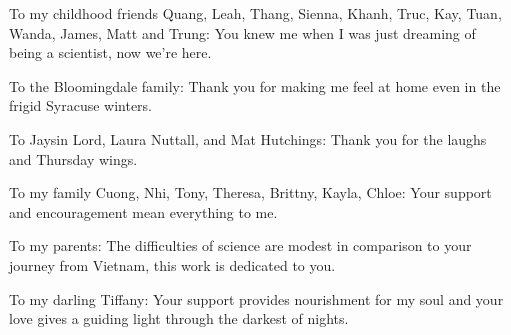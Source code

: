 	To my childhood friends Quang, Leah, Thang, Sienna, Khanh, Truc, Kay, Tuan, Wanda, James, Matt and Trung:  You knew me when I was just dreaming of being a scientist, now we're here.
	
	To the Bloomingdale family: Thank you for making me feel at home even in the frigid Syracuse winters.
	
	To Jaysin Lord, Laura Nuttall, and Mat Hutchings: Thank you for the laughs and Thursday wings.
	
	To my family Cuong, Nhi, Tony, Theresa, Brittny, Kayla, Chloe: Your support and encouragement mean everything to me.
	
	To my parents: The difficulties of science are modest in comparison to your journey from Vietnam, this work is dedicated to you.
	
	To my darling Tiffany: Your support provides nourishment for my soul and your love gives a guiding light through the darkest of nights.